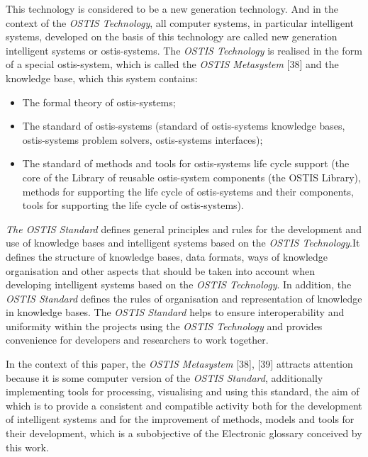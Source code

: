 \documentclass[10 pt]{extarticle}
\begin{document}
\begin{multicols}{2}
\setlength{\parskip}{0 pt}

This technology is considered to be a new generation
technology. And in the context of the \textit{OSTIS Technology},
all computer systems, in particular intelligent systems,
developed on the basis of this technology are called
new generation intelligent systems or ostis-systems. The
\textit{OSTIS Technology} is realised in the form of a special
ostis-system, which is called the \textit{OSTIS Metasystem} [38]
and the knowledge base, which this system contains:

\setlength{\parskip}{3 pt}
\begin{itemize}
    \item The formal theory of ostis-systems;
    \item \setlength{\parskip}{0 pt} The standard of ostis-systems (standard of ostis-systems knowledge
bases, ostis-systems problem solvers, ostis-systems interfaces);
    \item The standard of methods and tools for ostis-systems
life cycle support (the core of the Library of
reusable ostis-system components (the OSTIS Library), methods for supporting the life cycle of ostis-systems and their components, tools for supporting
the life cycle of ostis-systems).
\end{itemize}

\setlength{\parskip}{3 pt}

    \textit{The OSTIS Standard} defines general principles and rules for the
development and use of knowledge bases and intelligent systems based on the \textit{OSTIS Technology}.It defines the structure of knowledge bases, data formats, ways of knowledge organisation and other aspects that should be taken into account when developing intelligent systems based on the \textit{OSTIS Technology}. In addition, the \textit{OSTIS Standard} defines the rules of organisation and representation of knowledge in knowledge bases. The \textit{OSTIS Standard} helps to ensure interoperability and uniformity within the projects using the \textit{OSTIS Technology} and provides convenience for developers and researchers to work together.

\setlength{\parskip}{0 pt}

In the context of this paper, the \textit{OSTIS Metasystem} [38], [39] attracts attention because it is some computer version of the \textit{OSTIS Standard}, additionally implementing tools for processing, visualising and using this
standard, the aim of which is to provide a consistent and compatible activity both for the development of
intelligent systems and for the improvement of methods,
models and tools for their development, which is a subobjective of the Electronic glossary conceived by this
work.


\end{multicols}
\end{document}
